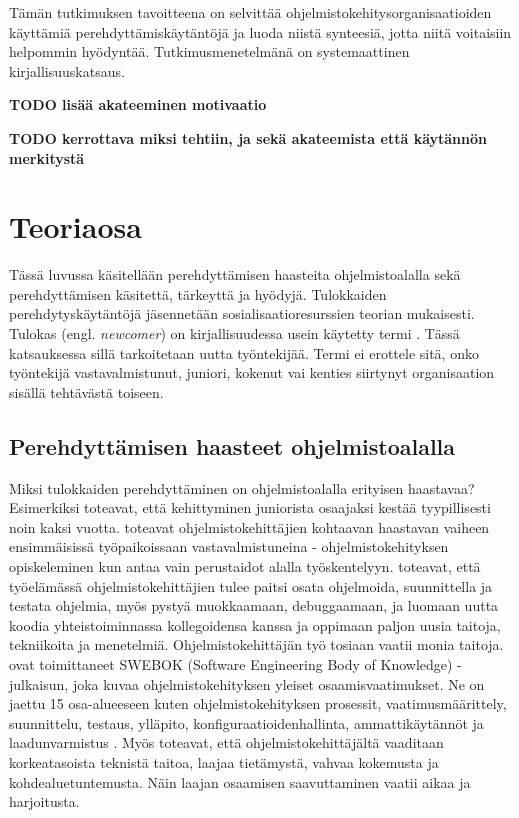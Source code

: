 \documentclass[utf8]{gradu3}
\begin{document}
Tämän tutkimuksen tavoitteena on selvittää ohjelmistokehitysorganisaatioiden käyttämiä perehdyttämiskäytäntöjä ja luoda niistä synteesiä, jotta niitä voitaisiin helpommin hyödyntää. Tutkimusmenetelmänä on systemaattinen kirjallisuuskatsaus.

\textbf{TODO lisää akateeminen motivaatio}

\textbf{TODO kerrottava miksi tehtiin, ja sekä akateemista että käytännön merkitystä}

\chapter{Teoriaosa}

Tässä luvussa käsitellään perehdyttämisen haasteita ohjelmistoalalla sekä perehdyttämisen käsitettä, tärkeyttä ja hyödyjä. Tulokkaiden perehdytyskäytäntöjä jäsennetään sosialisaatioresurssien teorian \parencite{saks-gruman-2012} mukaisesti. Tulokas (engl. \textit{newcomer}) on kirjallisuudessa usein käytetty termi %
\parencites%
    [mm.][]{matturro-ym-2017}%
    {begel-simon-2008-all-over-again}%
    {steinmacher-ym-2015}%
    {britto-ym-2019}%
\relax.
%
Tässä katsauksessa sillä tarkoitetaan uutta työntekijää. Termi ei erottele sitä, onko työntekijä vastavalmistunut, juniori, kokenut vai kenties siirtynyt organisaation sisällä tehtävästä toiseen.

\section{Perehdyttämisen haasteet ohjelmistoalalla}

Miksi tulokkaiden perehdyttäminen on ohjelmistoalalla erityisen haastavaa? Esimerkiksi \textcite{bologa-lupu-2014} toteavat, että kehittyminen juniorista osaajaksi kestää tyypillisesti noin kaksi vuotta. \textcite{begel-simon-2008-all-over-again} toteavat ohjelmistokehittäjien kohtaavan haastavan vaiheen ensimmäisissä työpaikoissaan vastavalmistuneina - ohjelmistokehityksen opiskeleminen kun antaa vain perustaidot alalla työskentelyyn. \textcite{begel-simon-2008-all-over-again} toteavat, että työelämässä ohjelmistokehittäjien tulee paitsi osata ohjelmoida, suunnittella ja testata ohjelmia, myös pystyä muokkaamaan, debuggaamaan, ja luomaan uutta koodia yhteistoiminnassa kollegoidensa kanssa ja oppimaan paljon uusia taitoja, tekniikoita ja menetelmiä. Ohjelmistokehittäjän työ tosiaan vaatii monia taitoja. \textcite{swebok} ovat toimittaneet SWEBOK (Software Engineering Body of Knowledge) -julkaisun, joka kuvaa ohjelmistokehityksen yleiset osaamisvaatimukset. Ne on jaettu 15 osa-alueeseen kuten ohjelmistokehityksen prosessit, vaatimusmäärittely, suunnittelu, testaus, ylläpito, konfiguraatioidenhallinta, ammattikäytännöt ja laadunvarmistus \parencite{swebok}. Myös \textcite{gregory-ym-2020} toteavat, että ohjelmistokehittäjältä vaaditaan korkeatasoista teknistä taitoa, laajaa tietämystä, vahvaa kokemusta ja kohdealuetuntemusta. Näin laajan osaamisen saavuttaminen vaatii aikaa ja harjoitusta.
\end{document}
